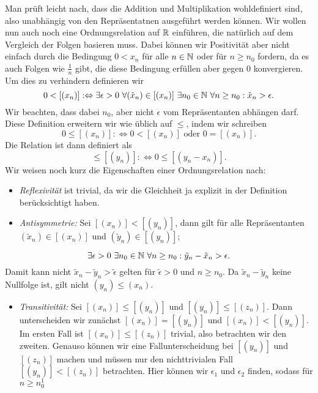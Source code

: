 Man prüft leicht nach, dass die Addition und Multiplikation wohldefiniert sind, also unabhängig von den Repräsentatnen ausgeführt werden können. Wir wollen nun auch noch eine Ordnungsrelation auf \(\mathbb{R}\) einführen, die natürlich auf dem Vergleich der Folgen basieren muss. Dabei können wir Positivität aber nicht einfach durch die Bedingung \(0 < x_n\) für alle \(n \in \mathbb{N}\) oder für \(n \geq n_0\) fordern, da es auch Folgen wie \(\frac{1}n\) gibt, die diese Bedingung erfüllen aber gegen \(0\) konvergieren.  Um dies zu verhindern definieren wir
\begin{equation*}
 0 < [(x_n)]:\Leftrightarrow \exists \epsilon > 0~\forall (\tilde x_n) \in [(x_n)]~\exists n_0 \in \mathbb{N} ~\forall n\geq n_0: \tilde x_n > \epsilon.
\end{equation*}
Wir beachten, dass dabei \(n_0\), aber nicht \(\epsilon\) vom Repräsentanten abhängen darf. Diese Definition erweitern wir wie üblich auf \(\leq\), indem wir schreiben
\begin{equation*}
0 \leq  [(x_n)]:\Leftrightarrow 0 < [(x_n)] \text{ oder } 0 = [(x_n)].
\end{equation*}
Die Relation ist dann definiert als
\begin{equation*}
[(x_n)] \leq [(y_n)] : \Leftrightarrow 0 \leq [(y_n-x_n)].
\end{equation*}
Wir weisen noch kurz die Eigenschaften einer Ordnungsrelation nach:
\begin{itemize}
\item {} 
\emph{Reflexivität} ist trivial, da wir die Gleichheit ja explizit in der Definition berücksichtigt haben.

\item {} 
\emph{Antisymmetrie:} Sei \([(x_n)] < [(y_n)]\), dann gilt für alle Repräsentanten \((\tilde x_n) \in [(x_n)]\) und
\((\tilde y_n) \in [(y_n)]\);

\end{itemize}
\begin{equation*}
\exists \epsilon > 0~\exists n_0 \in \mathbb{N}~\forall n \geq n_0: \tilde y_n - \tilde x_n > \epsilon.
\end{equation*}
Damit kann nicht \(\tilde x_n - \tilde y_n > \tilde \epsilon\) gelten für \(\tilde \epsilon >0\) und \(n \geq n_0\). Da \(\tilde x_n - \tilde y_n\) keine Nullfolge ist, gilt nicht \((y_n) \leq (x_n)\).
\begin{itemize}
\item {} 
\emph{Transitivität:} Sei \([(x_n)] \leq [(y_n)]\) und \([(y_n)] \leq [(z_n)]\). Dann unterscheiden wir zunächst \([(x_n)]=[(y_n)]\) und \([(x_n)]< [(y_n)]\). Im ersten Fall ist \([(x_n)] \leq [(z_n)]\) trivial, also betrachten wir den zweiten. Genauso können wir eine Fallunterscheidung bei \([(y_n)]\) und \([(z_n)]\) machen und müssen nur den nichttrivialen Fall \([(y_n)]<[(z_n)]\) betrachten. Hier können wir \(\epsilon_1\) und \(\epsilon_2\) finden, sodass für \(n\geq n_0^1\)

\end{itemize}

